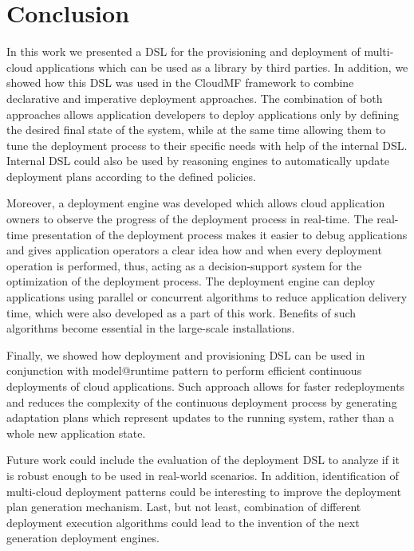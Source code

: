 
\chapter{Conclusion} %

\label{Chapter5} %


\noindent In this work we presented a DSL for the provisioning and deployment of multi-cloud applications which can be used as a library by third parties. In addition, we showed how this DSL was used in the CloudMF framework to combine declarative and imperative deployment approaches. The combination of both approaches allows application developers to deploy applications only by defining the desired final state of the system, while at the same time allowing them to tune the deployment process to their specific needs with help of the internal DSL. Internal DSL could also be used by reasoning engines to automatically update deployment plans according to the defined policies. 

\noindent Moreover, a deployment engine was developed which allows cloud application owners to observe the progress of the deployment process in real-time. The real-time presentation of the deployment process makes it easier to debug applications and gives application operators a clear idea how and when every deployment operation is performed, thus, acting as a decision-support system for the optimization of the deployment process. The deployment engine can deploy applications using parallel or concurrent algorithms to reduce application delivery time, which were also developed as a part of this work. Benefits of such algorithms become essential in the large-scale installations. 

\noindent Finally, we showed how deployment and provisioning DSL can be used in conjunction with model@runtime pattern to perform efficient continuous deployments of cloud applications. Such approach allows for faster redeployments and reduces the complexity of the continuous deployment process by generating adaptation plans which represent updates to the running system, rather than a whole new application state.

\noindent Future work could include the evaluation of the deployment DSL to analyze if it is robust enough to be used in real-world scenarios. In addition, identification of multi-cloud deployment patterns could be interesting to improve the deployment plan generation mechanism. Last, but not least, combination of different deployment execution algorithms could lead to the invention of the next generation deployment engines.